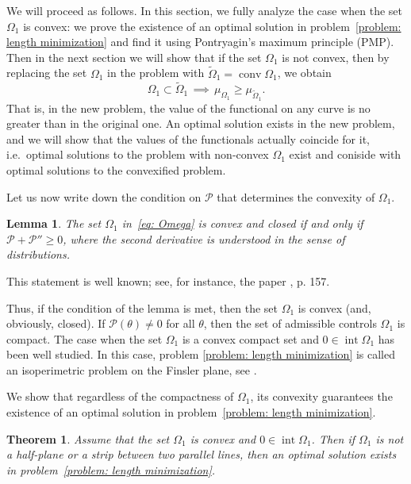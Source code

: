 \documentclass[a4paper,12pt]{article}
\newcommand {\PPP}{\mathcal{P}}
\newtheorem{theorem}{Theorem}
\newtheorem{lemma}{Lemma}
\theoremstyle{remark}
\theoremstyle{definition}
\begin{document}
We will proceed as follows. In this section, we fully analyze the case when the set $\Omega_1$ is convex: we prove the existence of an optimal solution in problem~\eqref{problem: length minimization} and find it using Pontryagin's maximum principle (PMP). Then in the next section we will show that if the set $\Omega_1$ is not convex, then by replacing the set $\Omega_1$ in the problem with $\tilde\Omega_1=\operatorname{conv}\Omega_1$, we obtain
$$
\Omega_1\subset {\tilde\Omega_1}
\,\implies\,
\mu_{\Omega_1} \ge \mu_{\tilde\Omega_1}.
$$
That is, in the new problem, the value of the functional on any curve is no greater than in the original one. An optimal solution exists in the new problem, and we will show that the values of the functionals actually coincide for it, i.e.\ optimal solutions to the problem with non-convex $\Omega_1$ exist and coniside with optimal solutions to the convexified problem.

Let us now write down the condition on $\PPP$ that determines the convexity of $\Omega_1.$

\begin{lemma}
	The set $\Omega_1$ in~\eqref{eq: Omega} is convex and closed if and only if  $\PPP + \PPP'' \ge 0$, where the second derivative is understood in the sense of distributions.
\end{lemma}

This statement is well known; see, for instance, the paper \cite{LP1}, p. 157.

Thus, if the condition of the lemma is met, then the set $\Omega_1$ is convex (and, obviously, closed).
If $\PPP(\theta) \neq 0$ for all $\theta$, then the set of admissible controls $\Omega_1$ is compact.
The case when the set $\Omega_1$ is a convex compact set and $0 \in \operatorname{int} \Omega_1$ has been well studied. In this case, problem \eqref{problem: length minimization} is called an isoperimetric problem on the Finsler plane, see \cite{Lokut1}.

We show that regardless of the compactness of $\Omega_1$, its convexity guarantees the existence of an optimal solution in problem~\eqref{problem: length minimization}.

\begin{theorem}
	\label{thm: existence}
	Assume that the set $\Omega_1$ is convex and $0\in\operatorname{int}\Omega_1$. Then if $\Omega_1$ is not a half-plane or a strip between two parallel lines, then an optimal solution exists in problem~\eqref{problem: length minimization}.
\end{theorem}
\end{document}
